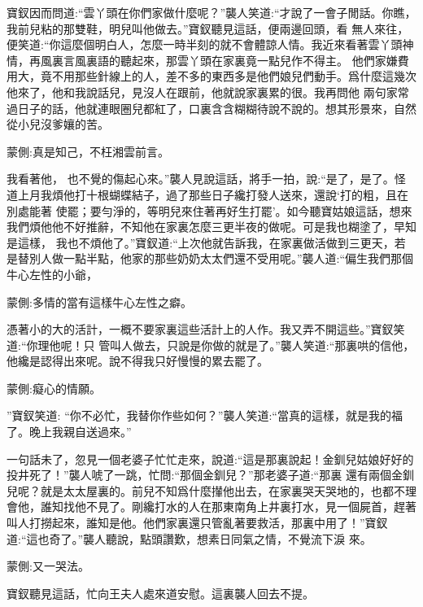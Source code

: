 \begin{parag}
    寶釵因而問道:“雲丫頭在你們家做什麼呢？”襲人笑道:“才說了一會子閒話。你瞧，我前兒粘的那雙鞋，明兒叫他做去。”寶釵聽見這話，便兩邊回頭，看 無人來往，便笑道:“你這麼個明白人，怎麼一時半刻的就不會體諒人情。我近來看著雲丫頭神情，再風裏言風裏語的聽起來，那雲丫頭在家裏竟一點兒作不得主。 他們家嫌費用大，竟不用那些針線上的人，差不多的東西多是他們娘兒們動手。爲什麼這幾次他來了，他和我說話兒，見沒人在跟前，他就說家裏累的很。我再問他 兩句家常過日子的話，他就連眼圈兒都紅了，口裏含含糊糊待說不說的。想其形景來，自然從小兒沒爹孃的苦。\begin{note}蒙側:真是知己，不枉湘雲前言。\end{note}我看著他， 也不覺的傷起心來。”襲人見說這話，將手一拍，說:“是了，是了。怪道上月我煩他打十根蝴蝶結子，過了那些日子纔打發人送來，還說‘打的粗，且在別處能著 使罷；要勻淨的，等明兒來住著再好生打罷’。如今聽寶姑娘這話，想來我們煩他他不好推辭，不知他在家裏怎麼三更半夜的做呢。可是我也糊塗了，早知是這樣， 我也不煩他了。”寶釵道:“上次他就告訴我，在家裏做活做到三更天，若是替別人做一點半點，他家的那些奶奶太太們還不受用呢。”襲人道:“偏生我們那個牛心左性的小爺，\begin{note}蒙側:多情的當有這樣牛心左性之癖。\end{note}憑著小的大的活計，一概不要家裏這些活計上的人作。我又弄不開這些。”寶釵笑道:“你理他呢！只 管叫人做去，只說是你做的就是了。”襲人笑道:“那裏哄的信他，他纔是認得出來呢。說不得我只好慢慢的累去罷了。\begin{note}蒙側:癡心的情願。\end{note}”寶釵笑道: “你不必忙，我替你作些如何？”襲人笑道:“當真的這樣，就是我的福了。晚上我親自送過來。”
\end{parag}


\begin{parag}
    一句話未了，忽見一個老婆子忙忙走來，說道:“這是那裏說起！金釧兒姑娘好好的投井死了！”襲人唬了一跳，忙問:“那個金釧兒？”那老婆子道:“那裏 還有兩個金釧兒呢？就是太太屋裏的。前兒不知爲什麼攆他出去，在家裏哭天哭地的，也都不理會他，誰知找他不見了。剛纔打水的人在那東南角上井裏打水，見一個屍首，趕著叫人打撈起來，誰知是他。他們家裏還只管亂著要救活，那裏中用了！”寶釵道:“這也奇了。”襲人聽說，點頭讚歎，想素日同氣之情，不覺流下淚 來。\begin{note}蒙側:又一哭法。\end{note}寶釵聽見這話，忙向王夫人處來道安慰。這裏襲人回去不提。
\end{parag}


